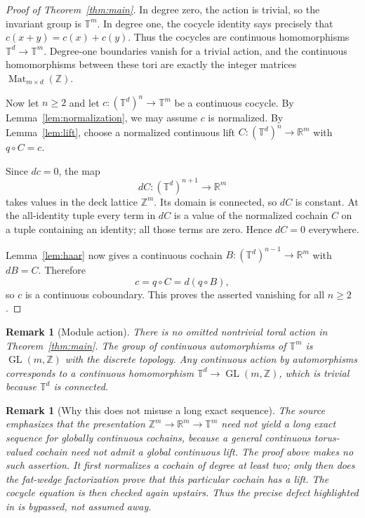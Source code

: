 \documentclass[11pt]{article}
\newtheorem{remark}[theorem]{Remark}
\newcommand{\T}{\mathbb T}
\newcommand{\R}{\mathbb R}
\newcommand{\Z}{\mathbb Z}
\begin{document}
\begin{proof}[Proof of Theorem~\ref{thm:main}]
In degree zero, the action is trivial, so the invariant group is $\T^m$.
In degree one, the cocycle identity says precisely that
$c(x+y)=c(x)+c(y)$.  Thus the cocycles are continuous homomorphisms
$\T^d\to\T^m$.  Degree-one boundaries vanish for a trivial action, and the
continuous homomorphisms between these tori are exactly the integer matrices
$\operatorname{Mat}_{m\times d}(\Z)$.

Now let $n\ge2$ and let $c:(\T^d)^n\to\T^m$ be a continuous cocycle.  By
Lemma~\ref{lem:normalization}, we may assume $c$ is normalized.  By
Lemma~\ref{lem:lift}, choose a normalized continuous lift
$C:(\T^d)^n\to\R^m$ with $q\circ C=c$.

Since $dc=0$, the map
\[
dC:(\T^d)^{n+1}\longrightarrow\R^m
\]
takes values in the deck lattice $\Z^m$.  Its domain is connected, so $dC$ is
constant.  At the all-identity tuple every term in $dC$ is a value of the
normalized cochain $C$ on a tuple containing an identity; all those terms are
zero.  Hence $dC=0$ everywhere.

Lemma~\ref{lem:haar} now gives a continuous cochain
$B:(\T^d)^{n-1}\to\R^m$ with $dB=C$.  Therefore
\[
c=q\circ C=d(q\circ B),
\]
so $c$ is a continuous coboundary.  This proves the asserted vanishing for
all $n\ge2$.
\end{proof}

\begin{remark}[Module action]
There is no omitted nontrivial toral action in Theorem~\ref{thm:main}.  The
group of continuous automorphisms of $\T^m$ is
$\operatorname{GL}(m,\Z)$ with the discrete topology.  Any continuous action
by automorphisms corresponds to a continuous homomorphism
$\T^d\to\operatorname{GL}(m,\Z)$, which is trivial because $\T^d$ is
connected.
\end{remark}

\begin{remark}[Why this does not misuse a long exact sequence]
The source emphasizes that the presentation
$\Z^m\to\R^m\to\T^m$ need not yield a long exact sequence for globally
continuous cochains, because a general continuous torus-valued cochain need
not admit a global continuous lift.  The proof above makes no such assertion.
It first normalizes a cochain of degree at least two; only then does the
fat-wedge factorization prove that this particular cochain has a lift.  The
cocycle equation is then checked again upstairs.  Thus the precise defect
highlighted in \cite{AustinPDE,AustinMoore} is bypassed, not assumed away.
\end{remark}
\end{document}
